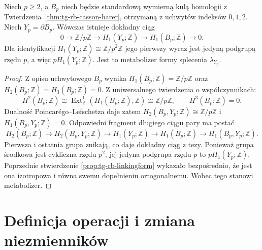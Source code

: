 \begin{stwierdzenie}
\label{st:tg-rb-boundary-kernel}
Niech $p\geq2$, a $B_p$ niech będzie
standardową wymierną kulą homologii
z Twierdzenia~\ref{thm:tg-rb-casson-harer},
otrzymaną z uchwytów indeksów $0,1,2$.
Niech $Y_p=\partial B_p$.
Wówczas istnieje dokładny ciąg
\[
0\longrightarrow\mathbb Z/p\mathbb Z
\longrightarrow H_1(Y_p;\mathbb Z)
\longrightarrow H_1(B_p;\mathbb Z)
\longrightarrow0.
\]
Dla identyfikacji $H_1(Y_p;\mathbb Z)
\cong\mathbb Z/p^2\mathbb Z$ jego pierwszy wyraz
jest jedyną podgrupą rzędu $p$,
a więc $pH_1(Y_p;\mathbb Z)$.
Jest to metabolizer formy splecenia
$\lambda_{Y_p}$.
\end{stwierdzenie}

\begin{proof}
Z opisu uchwytowego $B_p$ wynika
$H_1(B_p;\mathbb Z)=\mathbb Z/p\mathbb Z$
oraz $H_2(B_p;\mathbb Z)=H_3(B_p;\mathbb Z)=0$.
Z uniwersalnego twierdzenia o współczynnikach:
\[
H^2(B_p;\mathbb Z)
\cong\operatorname{Ext}^1_{\mathbb Z}
(H_1(B_p;\mathbb Z),\mathbb Z)
\cong\mathbb Z/p\mathbb Z,
\qquad
H^3(B_p;\mathbb Z)=0.
\]
Dualność Poincarégo--Lefschetza daje zatem
$H_2(B_p,Y_p;\mathbb Z)\cong\mathbb Z/p\mathbb Z$
i $H_1(B_p,Y_p;\mathbb Z)=0$.
Odpowiedni fragment długiego ciągu pary
ma postać
\[
H_2(B_p;\mathbb Z)\longrightarrow
H_2(B_p,Y_p;\mathbb Z)\longrightarrow
H_1(Y_p;\mathbb Z)\longrightarrow
H_1(B_p;\mathbb Z)\longrightarrow
H_1(B_p,Y_p;\mathbb Z).
\]
Pierwsza i ostatnia grupa znikają,
co daje dokładny ciąg z tezy.
Ponieważ grupa środkowa jest cykliczna
rzędu $p^2$, jej jedyna podgrupa
rzędu $p$ to $pH_1(Y_p;\mathbb Z)$.
Poprzednie stwierdzenie
\ref{prop:tg-rb-linkingform}
wykazało bezpośrednio, że jest
ona izotropowa i równa swemu
dopełnieniu ortogonalnemu.
Wobec tego stanowi metabolizer.
\end{proof}

\section{Definicja operacji i zmiana niezmienników}
\label{sec:tg-rb-definition}

